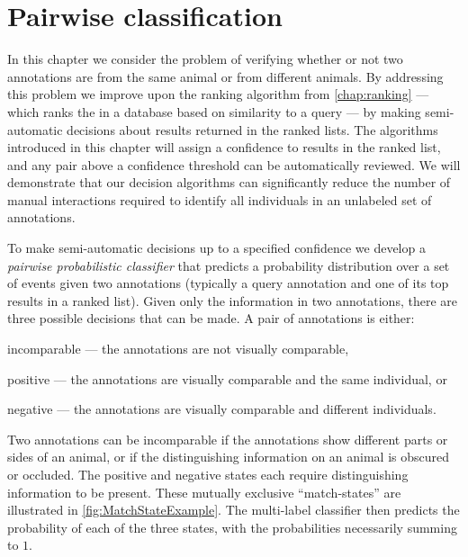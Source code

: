 
\begin{comment}
texfix.py --fpaths chapter4-pairclf.tex --outline --asmarkdown --numlines=999 
\end{comment}

\newcommand{\nan}{\text{nan}}

\chapter{Pairwise classification}\label{chap:pairclf}

In this chapter we consider the problem of verifying whether or not two annotations are from the same animal or
  from different animals.
By addressing this problem we improve upon the ranking algorithm from \cref{chap:ranking} --- which ranks the
  \names{} in a database based on similarity to a query --- by making semi-automatic decisions about results
  returned in the ranked lists.
The algorithms introduced in this chapter will assign a confidence to results in the ranked list, and any pair
  above a confidence threshold can be automatically reviewed.
We will demonstrate that our decision algorithms can significantly reduce the number of manual interactions
  required to identify all individuals in an unlabeled set of annotations.

To make semi-automatic decisions up to a specified confidence we develop a \emph{pairwise probabilistic
  classifier} that predicts a probability distribution over a set of events given two annotations (typically a
  query annotation and one of its top results in a ranked list).
Given only the information in two annotations,  there are three possible decisions that can be made.
A pair of annotations is either:
\begin{enumln}
    \item incomparable --- the annotations are not visually comparable,

    \item positive --- the annotations are visually comparable and the same individual, or

    \item negative --- the annotations are visually comparable and different individuals.
\end{enumln}
Two annotations can be incomparable if the annotations show different parts or sides of an animal, or if the
  distinguishing information on an animal is obscured or occluded.
The positive and negative states each require distinguishing information to be present.
These mutually exclusive ``match-states'' are illustrated in \cref{fig:MatchStateExample}.
The multi-label classifier then predicts the probability of each of the three states, with the probabilities
  necessarily summing to $1$.

